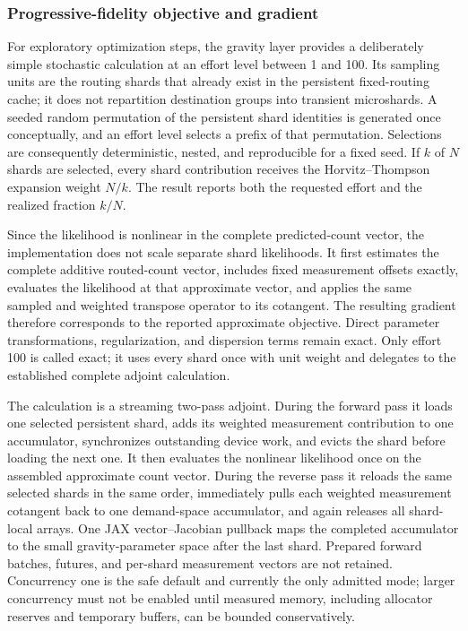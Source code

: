 \subsubsection{Progressive-fidelity objective and gradient}

For exploratory optimization steps, the gravity layer provides a deliberately
simple stochastic calculation at an effort level between 1 and 100.  Its
sampling units are the routing shards that already exist in the persistent
fixed-routing cache; it does not repartition destination groups into transient
microshards.  A seeded random permutation of the persistent shard identities
is generated once conceptually, and an effort level selects a prefix of that
permutation.  Selections are consequently deterministic, nested, and
reproducible for a fixed seed.  If $k$ of $N$ shards are selected, every shard
contribution receives the Horvitz--Thompson expansion weight $N/k$.  The result
reports both the requested effort and the realized fraction $k/N$.

Since the likelihood is nonlinear in the complete predicted-count vector, the
implementation does not scale separate shard likelihoods.  It first estimates
the complete additive routed-count vector, includes fixed measurement offsets
exactly, evaluates the likelihood at that approximate vector, and applies the
same sampled and weighted transpose operator to its cotangent.  The resulting
gradient therefore corresponds to the reported approximate objective.  Direct
parameter transformations, regularization, and dispersion terms remain exact.
Only effort 100 is called exact; it uses every shard once with unit weight and
delegates to the established complete adjoint calculation.

The calculation is a streaming two-pass adjoint.  During the forward pass it
loads one selected persistent shard, adds its weighted measurement
contribution to one accumulator, synchronizes outstanding device work, and
evicts the shard before loading the next one.  It then evaluates the nonlinear
likelihood once on the assembled approximate count vector.  During the reverse
pass it reloads the same selected shards in the same order, immediately pulls
each weighted measurement cotangent back to one demand-space accumulator, and
again releases all shard-local arrays.  One JAX vector--Jacobian pullback maps
the completed accumulator to the small gravity-parameter space after the last
shard.  Prepared forward batches, futures,
and per-shard measurement vectors are not retained.  Concurrency one is the
safe default and currently the only admitted mode; larger concurrency must not
be enabled until measured memory, including allocator reserves and temporary
buffers, can be bounded conservatively.

